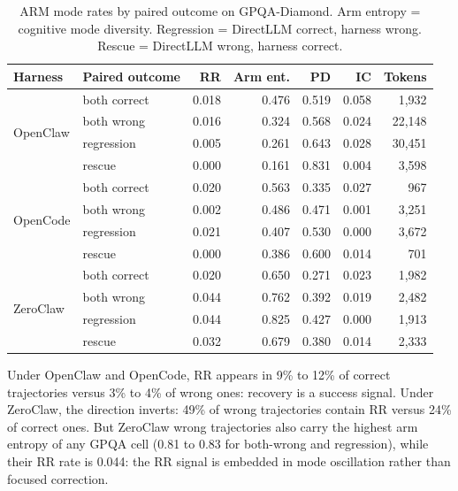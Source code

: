 \begin{table}[t]
\centering
\small
\caption{%
  ARM mode rates by paired outcome on GPQA-Diamond.
  Arm entropy = cognitive mode diversity.
  Regression = DirectLLM correct, harness wrong.
  Rescue = DirectLLM wrong, harness correct.
}
\label{tab:gpqa-arm-paired}
\setlength{\tabcolsep}{3pt}
\begin{tabular}{llrrrrr}
\toprule
Harness & Paired outcome & RR & Arm ent. & PD & IC & Tokens \\
\midrule
\multirow{4}{*}{OpenClaw}
  & both correct & 0.018 & 0.476 & 0.519 & 0.058 &  1{,}932 \\
  & both wrong   & 0.016 & 0.324 & 0.568 & 0.024 & 22{,}148 \\
  & regression   & 0.005 & 0.261 & 0.643 & 0.028 & 30{,}451 \\
  & rescue       & 0.000 & 0.161 & 0.831 & 0.004 &  3{,}598 \\
\midrule
\multirow{4}{*}{OpenCode}
  & both correct & 0.020 & 0.563 & 0.335 & 0.027 &    967 \\
  & both wrong   & 0.002 & 0.486 & 0.471 & 0.001 &  3{,}251 \\
  & regression   & 0.021 & 0.407 & 0.530 & 0.000 &  3{,}672 \\
  & rescue       & 0.000 & 0.386 & 0.600 & 0.014 &    701 \\
\midrule
\multirow{4}{*}{ZeroClaw}
  & both correct & 0.020 & 0.650 & 0.271 & 0.023 &  1{,}982 \\
  & both wrong   & 0.044 & 0.762 & 0.392 & 0.019 &  2{,}482 \\
  & regression   & 0.044 & 0.825 & 0.427 & 0.000 &  1{,}913 \\
  & rescue       & 0.032 & 0.679 & 0.380 & 0.014 &  2{,}333 \\
\bottomrule
\end{tabular}
\end{table}


Under OpenClaw and OpenCode, RR appears in 9\% to 12\% of correct trajectories
versus 3\% to 4\% of wrong ones: recovery is a success signal.
Under ZeroClaw, the direction inverts: 49\% of wrong trajectories contain RR
versus 24\% of correct ones.
But ZeroClaw wrong trajectories also carry the highest arm entropy of any GPQA
cell (0.81 to 0.83 for both-wrong and regression), while their RR rate is
0.044: the RR signal is embedded in mode oscillation rather than focused
correction.

